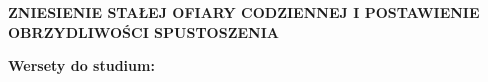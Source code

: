 \documentclass[10pt,a4paper,oneside]{article}
\begin{document}
\centerline{\textbf{\MakeUppercase{Zniesienie stałej ofiary codziennej i postawienie obrzydliwości spustoszenia}}}
\begin{center}
\textbf{Wersety do studium:} 
\end{center}
\end{document}
